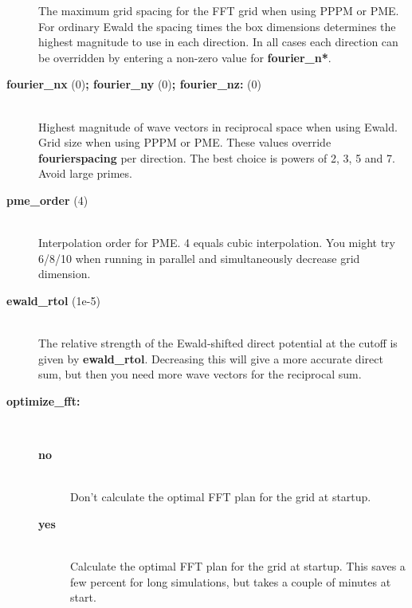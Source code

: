 \begin{description}
The maximum grid spacing for the FFT grid when using PPPM or PME.
For ordinary Ewald the spacing times the box dimensions determines the
highest magnitude to use in each direction. In all cases
each direction can be overridden by entering a non-zero value for
{\bf fourier\_n*}. 
\item[{\bf fourier\_nx }(0){\bf  ; fourier\_ny }(0){\bf  ; fourier\_nz: }(0)]\mbox{}\\
Highest magnitude of wave vectors in reciprocal space when using Ewald.
Grid size when using PPPM or PME. These values override
{\bf fourierspacing} per direction. The best choice is powers of
2, 3, 5 and 7. Avoid large primes.
\item[{\bf pme\_order }(4)]\mbox{}\\
Interpolation order for PME. 4 equals cubic interpolation. You might try
6/8/10 when running in parallel and simultaneously decrease grid dimension.
\item[{\bf ewald\_rtol }(1e-5)]\mbox{}\\
The relative strength of the Ewald-shifted direct potential at the cutoff
is given by {\bf ewald\_rtol}. Decreasing this will give a more accurate
direct sum, but then you need more wave vectors for the reciprocal sum.
\item[{\bf optimize\_fft:}]\mbox{}\\
\vspace{-2ex}\begin{description}
\item[{\bf no}]\mbox{}\\
Don't calculate the optimal FFT plan for the grid at startup.
\item[{\bf yes}]\mbox{}\\
Calculate the optimal FFT plan for the grid at startup. This saves a
few percent for long simulations, but takes a couple of minutes
at start.
\end{description}
\end{description}

